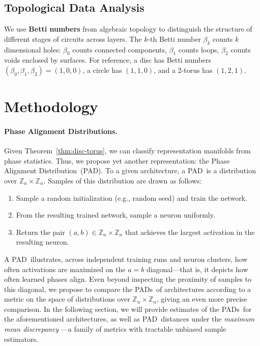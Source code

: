 \documentclass{article} %
\newcommand{\diagplot}{Phase Alignment Distribution}
\newcommand{\diagplots}{Phase Alignment Distributions}
\newcommand{\diagplotacr}{PAD}
\newcommand{\diagplotacrs}{PADs}
\theoremstyle{plain}
\theoremstyle{definition}
\newtheorem{empirical fact}[theorem]{Empirical Fact}
\begin{document}
\subsection{Topological Data Analysis}

We use \textbf{Betti numbers} from algebraic topology to distinguish the structure of different stages of circuits across layers. The $k$-th Betti number $\beta_k$ counts $k$ dimensional holes: $\beta_0$ counts connected components, $\beta_1$ counts loops, $\beta_2$ counts voids enclosed by surfaces. For reference, a disc has Betti numbers $(\beta_0, \beta_1, \beta_2) = (1, 0, 0)$, a circle has $(1, 1, 0)$, and a 2-torus has $(1, 2, 1)$.




\section{Methodology}\label{sec:methods}


\paragraph{\diagplots.} Given Theorem~\ref{thm:disc-torus}, we can classify representation manifolds from phase statistics. Thus, we propose yet another representation: the \diagplot\, (\diagplotacr).
To a given architecture, a \diagplotacr\, is a distribution over $\mathbb{Z}_n\times\mathbb{Z}_n$. Samples of this distribution are drawn as follows:
\begin{enumerate}
    \item Sample a random initialization (e.g., random seed) and train the network.
    \item From the resulting trained network, sample a neuron uniformly.
    \item Return the pair $(a, b)\in\mathbb{Z}_n\times\mathbb{Z}_n$ that achieves the largest activation in the resulting neuron.
\end{enumerate}
A \diagplotacr\, illustrates, across independent training runs and neuron clusters, how often activations are maximized on the $a=b$ diagonal---that is, it depicts how often learned phases align.
Even beyond inspecting the proximity of samples to this diagonal, we propose to compare the \diagplotacrs\, of architectures according to a metric on the space of distributions over $\mathbb{Z}_n\times\mathbb{Z}_n$, giving an even more precise comparison.
In the following section, we will provide estimates of the \diagplotacrs\, for the aforementioned architectures, as well as \diagplotacr\, distances under the \emph{maximum mean discrepancy} \citep[MMD]{gretton2012kernel}---a family of metrics with tractable unbiased sample estimators. 
\end{document}
